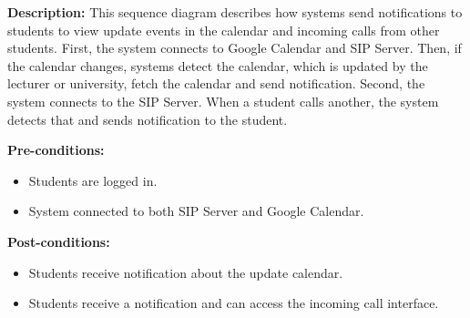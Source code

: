     \textbf{Description:} This sequence diagram describes how systems send notifications to students to view update events in the calendar and incoming calls from other students. 
    First, the system connects to Google Calendar and SIP Server. 
    Then, if the calendar changes, systems detect the calendar, which is updated by the lecturer or university, fetch the calendar and send notification. 
    Second, the system connects to the SIP Server. When a student calls another, the system detects that and sends notification to the student.

    \noindent \textbf{Pre-conditions:} 
        \begin{itemize}
            \item Students are logged in.
            \item System connected to both SIP Server and Google Calendar.
        \end{itemize}
    \noindent \textbf{Post-conditions:}
    \begin{itemize}
        \item Students receive notification about the update calendar.
        \item Students receive a notification and can access the incoming call interface.
    \end{itemize}
